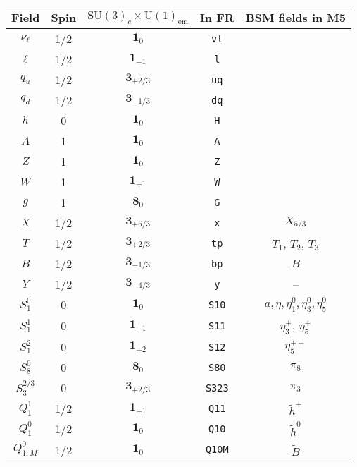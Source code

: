 \documentclass[preprintnumbers,nofootinbib,showpacs,eqsecnum,pre,12pt]{revtex4-1}
\newcommand{\ra}[1]{\renewcommand{\arraystretch}{#1}}
\newcommand{\SU}{\text{SU}}
\newcommand{\U}{\text{U}}
\begin{document}
\begin{table}	
	\centering
	\ra{1.0}
	\begin{tabular}{@{}ccccc@{}}\hline
		Field & Spin & $\SU(3)_c\times\U(1)_\mathrm{em}$ &In FR &  BSM fields in M5 \\ \hline 
		$\nu_\ell$ & 1/2 & $\mathbf{1}_{0}$ & \texttt{vl}  &\\
		$\ell$ & 1/2 & $\mathbf{1}_{-1}$ & \texttt{l} &\\
		$q_u$ & 1/2 & $\mathbf{3}_{+2/3}$ & \texttt{uq} & \\
		$q_d$ & 1/2 & $\mathbf{3}_{-1/3}$ & \texttt{dq} & \\
		$h$ & 0 & $\mathbf{1}_0$ & \texttt{H}&\\
		$A$ & 1 & $\mathbf{1}_0$ & \texttt{A}&\\
		$Z$ & 1 & $\mathbf{1}_0$ & \texttt{Z}&\\
		$W$ & 1 & $\mathbf{1}_{+1}$ & \texttt{W}&\\
		$g$ & 1 & $\mathbf{8}_0$ & \texttt{G}&\\				
		\hline
		$X$ & 1/2 & $\mathbf{3}_{+5/3}$ & \texttt{x}& $X_{5/3}$\\
		$T$ & 1/2 & $\mathbf{3}_{+2/3}$ & \texttt{tp}  & $T_1$, $T_2$, $T_3$ \\
		$B$ & 1/2 & $\mathbf{3}_{-1/3}$ & \texttt{bp}  & $B$ \\
		$Y$ & 1/2 & $\mathbf{3}_{-4/3}$ & \texttt{y}  & --\\ 
		\hline 
		$S_1^0$ & 0 & $\mathbf{1}_{0}$ & \texttt{S10} &  $a,\eta,\eta_1^0,\eta_3^0,\eta_5^0$\\
		
		$S_1^1$ & 0 & $\mathbf{1}_{+1}$ & \texttt{S11}& $\eta_3^+ $, $\eta_5^+$\\
		
		$S_1^2$ & 0 & $\mathbf{1}_{+2}$ & \texttt{S12} & $\eta_5^{++}$\\
		
		$S_8^0$ & 0 & $\mathbf{8}_{0}$ & \texttt{S80} & $\pi_8$\\
		
		$S_3^{2/3}$ & 0 & $\mathbf{3}_{+2/3}$ & \texttt{S323} & $\pi_3$\\
		
		$Q_1^1$ & 1/2 & $\mathbf{1}_{+1}$ & \texttt{Q11} & $\tilde h^+$\\
		$Q_{1}^0$ & 1/2 & $\mathbf{1}_{0}$ & \texttt{Q10}  & $\tilde h^0$\\
		$Q_{1,M}^0$ & 1/2 & $\mathbf{1}_{0}$ & \texttt{Q10M} & $\tilde B$\\
		

\end{tabular}
\end{table}
\end{document}
